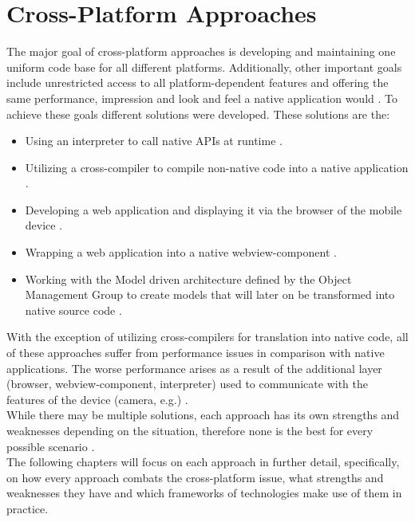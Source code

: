 \documentclass[Bachelor,BIF,english]{twbook}
\begin{document}
\section{Cross-Platform Approaches}
The major goal of cross-platform approaches is developing and maintaining one uniform code base for all different platforms. Additionally, other important goals include unrestricted access to all platform-dependent features and offering the same performance, impression and look and feel a native application would \cite[p.~1]{7479278} \cite[p.~1]{7934674}. To achieve these goals different solutions were developed. These solutions are the: 
\begin{itemize}
\item Using an interpreter to call native APIs at runtime \cite[p.~3]{7479278} \cite[p.~4-5]{LinckArne2016} \cite[p.~5-6]{Hansson_Vidhall_2016}.
\item Utilizing a cross-compiler to compile non-native code into a native application \cite[p.~3-4]{7479278} \cite[p.~5]{Hansson_Vidhall_2016}.
\item Developing a web application and displaying it via the browser of the mobile device \cite[p.~2]{7479278} \cite[p.~2-3]{LinckArne2016} \cite[p.~4-5]{Hansson_Vidhall_2016}.
\item Wrapping a web application into a native webview-component \cite[p.~2-3]{7479278} \cite[p.~3-4]{LinckArne2016} \cite[p.~5]{Hansson_Vidhall_2016}.
\item Working with the Model driven architecture defined by the Object Management Group to create models that will later on be transformed into native source code \cite[p.~4]{7479278} \cite[p.~3]{7934674}.
\end{itemize}
With the exception of utilizing cross-compilers for translation into native code, all of these approaches suffer from performance issues in comparison with native applications. The worse performance arises as a result of the additional layer (browser, webview-component, interpreter) used to communicate with the features of the device (camera, e.g.) \cite[p.~2,~10]{JohanssonSderberg2018} \cite[p.~5-6]{LinckArne2016} \cite[p.~111]{Keist2016}.
\\[\baselineskip]
While there may be multiple solutions, each approach has its own strengths and weaknesses depending on the situation, therefore none is the best for every possible scenario \cite[p.~110]{Keist2016}.
\\[\baselineskip]
The following chapters will focus on each approach in further detail, specifically, on how every approach combats the cross-platform issue, what strengths and weaknesses they have and which frameworks of technologies make use of them in practice.
\end{document}
